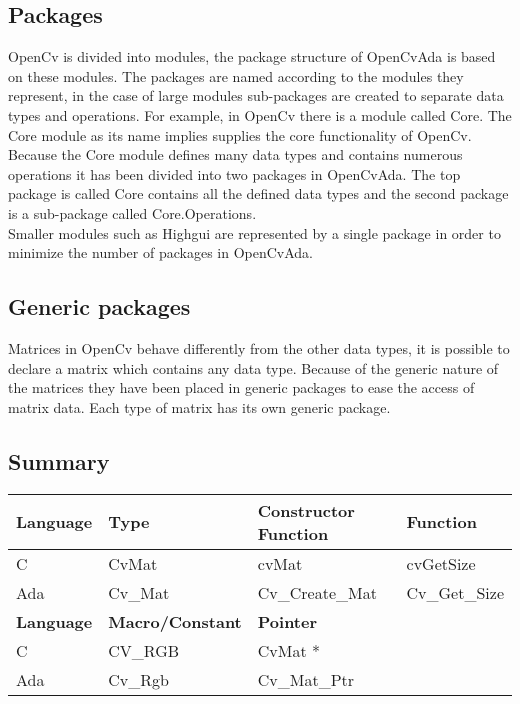 \subsection{Packages}
OpenCv is divided into modules, the package structure of OpenCvAda is based on these modules. The packages are named according to the modules they represent, in the case of large modules sub-packages are created to separate data types and operations.
For example, in OpenCv there is a module called Core. The Core module as its name implies supplies the core functionality of OpenCv. Because the Core module defines many data types and contains numerous operations it has been divided into two packages in OpenCvAda. The top package is called Core contains all the defined data types and the second package is a sub-package called Core.Operations.\\
Smaller modules such as Highgui are represented by a single package in order to minimize the number of packages in OpenCvAda.
\subsection{Generic packages}
Matrices in OpenCv behave differently from the other data types, it is possible to declare a matrix which contains any data type. Because of the generic nature of the matrices they have been placed in generic packages to ease the access of matrix data. Each type of matrix has its own generic package.
\subsection{Summary}
\begin{tabular}{| l | l | l | l |}
\hline
\textbf{Language} & \textbf{Type} & \textbf{Constructor Function} & \textbf{Function} \\ \hline
C & CvMat & cvMat & cvGetSize  \\ \hline
Ada & Cv_Mat & Cv_Create_Mat & Cv_Get_Size  \\ \hline \hline
\textbf{Language} & \textbf{Macro/Constant} & \textbf{Pointer} & \\ \hline 
C & CV_RGB & CvMat * &  \\ \hline
Ada & Cv_Rgb & Cv_Mat_Ptr & \\ \hline
\end{tabular}
